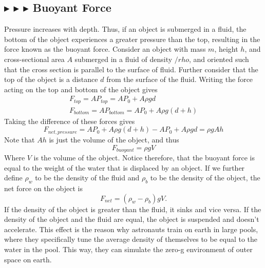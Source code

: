 %
%
\subsection{\color{OrangeRed} $\blacktriangleright$ \color{Goldenrod} $\blacktriangleright$ \color{Orchid} $\blacktriangleright$ \color{black} Buoyant Force}\label{1.7.2}
Pressure increases with depth. Thus, if an object is submerged in a fluid, the bottom of the object experiences a greater pressure than the top, resulting in the force known as the buoyant force. Consider an object with mass $m$, height $h$, and cross-sectional area $A$ submerged in a fluid of density $/rho$, and oriented such that the cross section is parallel to the surface of fluid. Further consider that the top of the object is a distance $d$ from the surface of the fluid. Writing the force acting on the top and bottom of the object gives
\begin{align*}
    F_{top} = AP_{top} = AP_0 + A\rho gd \\
    F_{bottom} = AP_{bottom} = AP_0 + A\rho g(d+h)
\end{align*}
\noindent Taking the difference of these forces gives
\begin{equation*}
    F_{net,pressure} = AP_0 + A\rho g(d+h) - AP_0 + A\rho gd = \rho gAh
\end{equation*}
\noindent Note that $Ah$ is just the volume of the object, and thus
\begin{equation}
    \boxed{F_{buoyant} = \rho g V}
\end{equation}
\noindent Where $V$ is the volume of the object. Notice therefore, that the buoyant force is equal to the weight of the water that is displaced by an object. If we further define $\rho_w$ to be the density of the fluid and $\rho_b$ to be the density of the object, the net force on the object is
\begin{equation*}
    F_{net} = (\rho_w-\rho_b)gV.
\end{equation*}
\noindent If the density of the object is greater than the fluid, it sinks and vice versa. If the density of the object and the fluid are equal, the object is suspended and doesn't accelerate. This effect is the reason why astronauts train on earth in large pools, where they specifically tune the average density of themselves to be equal to the water in the pool. This way, they can simulate the zero-g environment of outer space on earth. 

